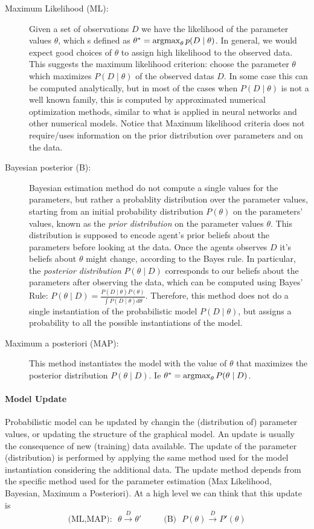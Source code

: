 \begin{description}
\item[Maximum Likelihood (ML):] Given a set of observations $D$ we have
  the likelihood of the parameter values $\theta$, which s defined
  as $\theta^*=\operatorname*{argmax}_{\theta}p(D\mid\theta)$. 
  In general, we would expect good choices of $\theta$ to assign high
  likelihood to the observed data. This suggests the maximum
  likelihood criterion: choose the parameter $\theta$ which maximizes
  $P(D\mid\theta)$ of the observed datas $D$.
  In some case this can be computed analytically,
  but in most of the cases when $P(D\mid\theta)$ is not a well known
  family, this is computed by approximated numerical optimization
  methods, similar to what is applied in neural networks and other
  numerical models. Notice that Maximum likelihood criteria does not
  require/uses information on the prior distribution over parameters
  and on the data.
\item[Bayesian posterior (B):] Bayesian estimation method do not compute a single
  values for the parameters, but rather a probablity distribution over
  the parameter values, starting from an initial probability
  distribution $P(\theta)$ on the parameters' values, known as the
  \emph{prior distribution} on the parameter values $\theta$. This
  distribution is supposed to encode agent's prior beliefs about the
  parameters before looking at the data. Once the agents observes $D$
  it's beliefs about $\theta$ might change, according to the Bayes
  rule.  In particular, the \emph{posterior distribution}
  $P(\theta\mid D)$ corresponds to our beliefs about the parameters
  after observing the data, which can be computed using Bayes’ Rule:
  $P(\theta\mid D) =\frac{P(D\mid\theta) P(\theta)}{\int
    P(D\mid\theta) d\theta}$. Therefore, this method does not do a
  single instantiation of the probabilistic model $P(D\mid\theta)$,
  but assigns a probability to all the possible instantiations of the
  model. 
\item[Maximum a posteriori (MAP):] This method instantiates the model with
  the value of $\theta$ that maximizes the posterior distribution
  $P(\theta\mid D)$. Ie $\theta^*=\operatorname*{argmax}_{\theta}P(\theta\mid D)$. 
\end{description}

\paragraph{Model Update} 
Probabilistic model can be updated by changin the (distribution of)
parameter values, or updating the structure of the graphical model. An
update is usually the consequence of new (training) data available.
The update of the parameter (distribution) is performed by applying
the same method used for the model instantiation considering the
additional data. The update method depends from the specific method
used for the parameter estimation (Max Likelihood, Bayesian, Maximum a
Posteriori). At a high level we can think that this
update is
$$
\text{(ML,MAP):}\ \ \  \theta \stackrel{D}{\longrightarrow} \theta'
\ \ \ \ \ \ \ \ \ \ \ \
\text{(B)}\ \ \ P(\theta) \stackrel{D}{\longrightarrow} P'(\theta)
$$

